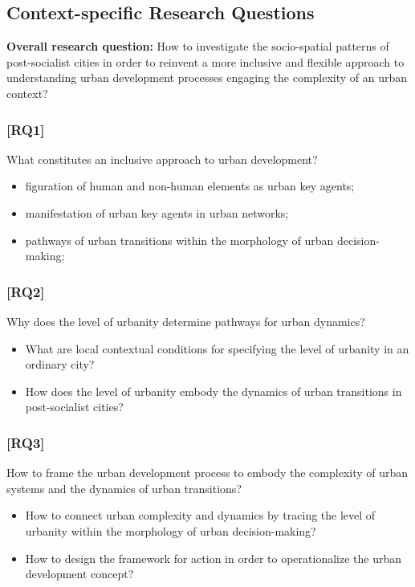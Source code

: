 \documentclass[11pt]{report}
\begin{document}
{{{{\subsection{Context-specific Research Questions}

\textbf{Overall research question:} How to investigate the socio-spatial patterns of post-socialist cities in order to reinvent a more inclusive and flexible approach to understanding urban development processes engaging the complexity of an urban context? 

\subsubsection{[RQ1]}
What constitutes an inclusive approach to urban development?
\begin{itemize}
\item figuration of human and non-human elements as urban key agents;
\item manifestation of urban key agents in urban networks;
\item pathways of urban transitions within the morphology of urban decision-making;
\end {itemize}

\subsubsection{[RQ2]}
Why does the level of urbanity determine pathways for urban dynamics? 
\begin{itemize}
\item What are local contextual conditions for specifying the level of urbanity in an ordinary city?
\item How does the level of urbanity embody the dynamics of urban transitions in post-socialist cities?
\end {itemize}

\subsubsection{[RQ3]}
How to frame the urban development process to embody the complexity of urban systems and the dynamics of urban transitions?
\begin{itemize}
\item How to connect urban complexity and dynamics by tracing the level of urbanity within the morphology of urban decision-making?
\item How to design the framework for action in order to operationalize the urban development concept?
\end {itemize}

}}}}
\end{document}
